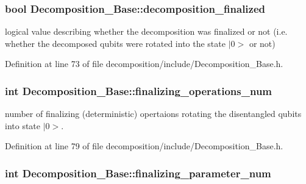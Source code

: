 \subsubsection[{\texorpdfstring{decomposition\+\_\+finalized}{decomposition_finalized}}]{\setlength{\rightskip}{0pt plus 5cm}bool Decomposition\+\_\+\+Base\+::decomposition\+\_\+finalized\hspace{0.3cm}{\ttfamily [protected]}}\hypertarget{class_decomposition___base_a488bfdaecfefa4fb9fb3149657b40b6d}{}\label{class_decomposition___base_a488bfdaecfefa4fb9fb3149657b40b6d}


logical value describing whether the decomposition was finalized or not (i.\+e. whether the decomposed qubits were rotated into the state $\vert$0$>$ or not) 



Definition at line 73 of file decomposition/include/\+Decomposition\+\_\+\+Base.\+h.

\subsubsection[{\texorpdfstring{finalizing\+\_\+operations\+\_\+num}{finalizing_operations_num}}]{\setlength{\rightskip}{0pt plus 5cm}int Decomposition\+\_\+\+Base\+::finalizing\+\_\+operations\+\_\+num\hspace{0.3cm}{\ttfamily [protected]}}\hypertarget{class_decomposition___base_a0685291401fc40fee1121eddba63a429}{}\label{class_decomposition___base_a0685291401fc40fee1121eddba63a429}


number of finalizing (deterministic) opertaions rotating the disentangled qubits into state $\vert$0$>$. 



Definition at line 79 of file decomposition/include/\+Decomposition\+\_\+\+Base.\+h.

\subsubsection[{\texorpdfstring{finalizing\+\_\+parameter\+\_\+num}{finalizing_parameter_num}}]{\setlength{\rightskip}{0pt plus 5cm}int Decomposition\+\_\+\+Base\+::finalizing\+\_\+parameter\+\_\+num\hspace{0.3cm}{\ttfamily [protected]}}\hypertarget{class_decomposition___base_ae83ca982ee7da29119245860d212864c}{}\label{class_decomposition___base_ae83ca982ee7da29119245860d212864c}



